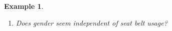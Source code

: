 \documentclass[12pt]{amsart}
\newtheorem{example}[theorem]{Example}
\begin{document}
{\begin{example}
\begin{enumerate}
\vspace{4cm}

\item Does gender seem independent of seat belt usage?

\end{enumerate}


\end{example}




}  %
\end{document}
